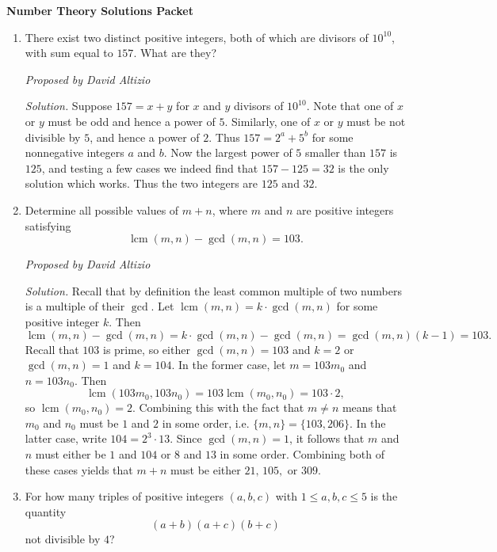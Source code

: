 \documentclass[10pt]{article}
\newcommand{\lcm}{\operatorname{lcm}}
\newcommand{\proposed}[1]
{
\vspace{5pt}
\noindent\textit{Proposed by #1}
}
\newcommand{\solution}
{
\vspace{5pt}
\noindent\textit{Solution.}\qquad
}
\begin{document}
\begin{center}
\huge\textbf{Number Theory Solutions Packet}\normalsize

\vspace{3pt}
\end{center}

\begin{enumerate}

	\item There exist two distinct positive integers, both of which are divisors of $10^{10}$, with sum equal to $157$.  What are they?
	
	\proposed{David Altizio}
	
	\solution Suppose $157=x+y$ for $x$ and $y$ divisors of $10^{10}$.  Note that one of $x$ or $y$ must be odd and hence a power of $5$.  Similarly, one of $x$ or $y$ must be not divisible by $5$, and hence a power of $2$.  Thus $157 = 2^a + 5^b$ for some nonnegative integers $a$ and $b$.  Now the largest power of $5$ smaller than $157$ is $125$, and testing a few cases we indeed find that $157-125 = 32$ is the only solution which works.  Thus the two integers are $\boxed{125\text{ and }32}$.

	\item Determine all possible values of $m+n$, where $m$ and $n$ are positive integers satisfying \[\lcm(m,n) - \gcd(m,n) = 103.\]
	
	\proposed{David Altizio}
	
	\solution Recall that by definition the least common multiple of two numbers is a multiple of their $\gcd$.  Let $\lcm(m,n) = k\cdot\gcd(m,n)$ for some positive integer $k$.  Then \[\lcm(m,n) - \gcd(m,n) = k\cdot\gcd(m,n) - \gcd(m,n) = \gcd(m,n)(k-1) = 103.\] Recall that $103$ is prime, so either $\gcd(m,n) = 103$ and $k=2$ or $\gcd(m,n) = 1$ and $k=104$.  In the former case, let $m=103m_0$ and $n=103n_0$.  Then \[\lcm(103m_0,103n_0) = 103\lcm(m_0,n_0) = 103\cdot 2,\] so $\lcm(m_0,n_0) = 2$.  Combining this with the fact that $m\neq n$ means that $m_0$ and $n_0$ must be $1$ and $2$ in some order, i.e. $\{m,n\}=\{103,206\}$.  In the latter case, write $104 = 2^3\cdot 13$.  Since $\gcd(m,n) = 1$, it follows that $m$ and $n$ must either be $1$ and $104$ or $8$ and $13$ in some order.  Combining both of these cases yields that $m+n$ must be either $\boxed{21,\,105,\text{ or }309}$.
	
	\item For how many triples of positive integers $(a,b,c)$ with $1\leq a,b,c\leq 5$ is the quantity \[(a+b)(a+c)(b+c)\] not divisible by $4$?
	

\end{enumerate}
\end{document}
